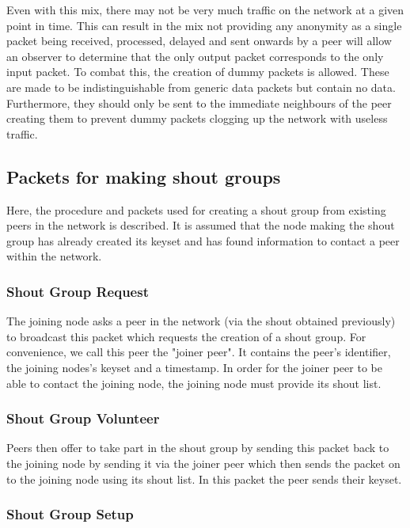 \documentclass[ %
                    author={Luke Murray},
                supervisor={Dr. Simon Hollis},
                     title={Shadow Peer-to-Peer Networks},
                  subtitle={},
                    degree={MEng},
                      year={2013} ]{thesis}
\begin{document}
Even with this mix, there may not be very much traffic on the network at a given point in time. This can result in the mix not providing any anonymity as a single packet being received, processed, delayed and sent onwards by a peer will allow an observer to determine that the only output packet corresponds to the only input packet. To combat this, the creation of dummy packets is allowed. These are made to be indistinguishable from generic data packets but contain no data. Furthermore, they should only be sent to the immediate neighbours of the peer creating them to prevent dummy packets clogging up the network with useless traffic.

\subsection{Packets for making shout groups}
\label{sec:create_shout_group}

Here, the procedure and packets used for creating a shout group from existing peers in the network is described. It is assumed that the node making the shout group has already created its keyset and has found information to contact a peer within the network.

\subsubsection{Shout Group Request}

The joining node asks a peer in the network (via the shout obtained previously) to broadcast this packet which requests the creation of a shout group. For convenience, we call this peer the "joiner peer". It contains the peer's identifier, the joining nodes's keyset and a timestamp. In order for the joiner peer to be able to contact the joining node, the joining node must provide its shout list.

\subsubsection{Shout Group Volunteer}

Peers then offer to take part in the shout group by sending this packet back to the joining node by sending it via the joiner peer which then sends the packet on to the joining node using its shout list. In this packet the peer sends their keyset. 

\subsubsection{Shout Group Setup}
\end{document}

